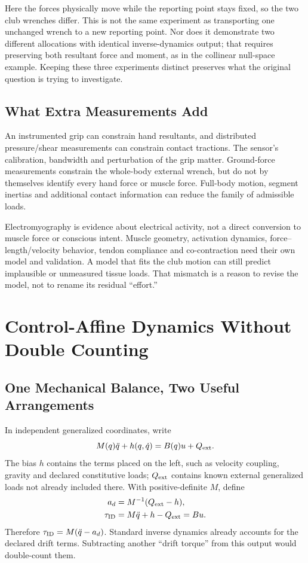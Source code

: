 \documentclass[11pt,a4paper]{article}
\begin{document}
Here the forces physically move while the reporting point stays fixed, so the two club wrenches differ. This is not the same experiment as transporting one unchanged wrench to a new reporting point. Nor does it demonstrate two different allocations with identical inverse-dynamics output; that requires preserving both resultant force and moment, as in the collinear null-space example. Keeping these three experiments distinct preserves what the original question is trying to investigate.

\subsection{What Extra Measurements Add}
An instrumented grip can constrain hand resultants, and distributed pressure/shear measurements can constrain contact tractions. The sensor's calibration, bandwidth and perturbation of the grip matter. Ground-force measurements constrain the whole-body external wrench, but do not by themselves identify every hand force or muscle force. Full-body motion, segment inertias and additional contact information can reduce the family of admissible loads.

Electromyography is evidence about electrical activity, not a direct conversion to muscle force or conscious intent. Muscle geometry, activation dynamics, force--length/velocity behavior, tendon compliance and co-contraction need their own model and validation. A model that fits the club motion can still predict implausible or unmeasured tissue loads. That mismatch is a reason to revise the model, not to rename its residual ``effort.''

\section{Control-Affine Dynamics Without Double Counting}
\subsection{One Mechanical Balance, Two Useful Arrangements}
In independent generalized coordinates, write
\begin{equation}
M(q)\ddot q+h(q,\dot q)=B(q)u+Q_{\rm ext}.
\label{eq:lagrange}
\end{equation}
The bias $h$ contains the terms placed on the left, such as velocity coupling, gravity and declared constitutive loads; $Q_{\rm ext}$ contains known external generalized loads not already included there. With positive-definite $M$, define
\begin{align}
a_d&=M^{-1}(Q_{\rm ext}-h),\\
\tau_{\rm ID}&=M\ddot q+h-Q_{\rm ext}=Bu.\label{eq:inverse_dynamics}
\end{align}
Therefore $\tau_{\rm ID}=M(\ddot q-a_d)$. Standard inverse dynamics already accounts for the declared drift terms. Subtracting another ``drift torque'' from this output would double-count them.
\end{document}
